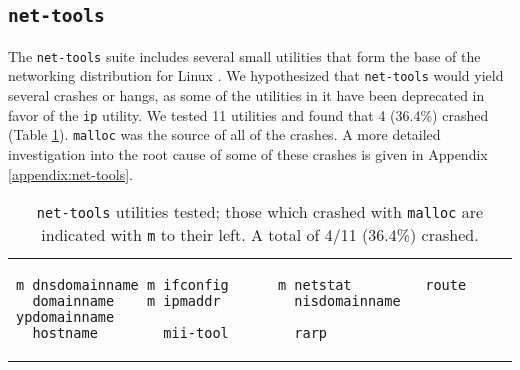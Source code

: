 \subsection{\texttt{net-tools}}
The \texttt{net-tools} suite includes several small utilities that form the base of the networking distribution for Linux \cite{nettools}. We hypothesized that \texttt{net-tools} would yield several crashes or hangs, as some of the utilities in it have been deprecated in favor of the \texttt{ip} utility. We tested 11 utilities and found that 4 (36.4\%) crashed (Table \ref{lst:net-tools}). \texttt{malloc} was the source of all of the crashes. A more detailed investigation into the root cause of some of these crashes is given in Appendix \ref{appendix:net-tools}.

\begin{table}[h]
\begin{tabular}{l}
\begin{lstlisting}
m dnsdomainname m ifconfig      m netstat         route
  domainname    m ipmaddr         nisdomainname   ypdomainname
  hostname        mii-tool        rarp
\end{lstlisting}
\end{tabular}
\caption{\texttt{net-tools} utilities tested; those which crashed with \texttt{malloc} are indicated with \texttt{m} to their left. A total of 4/11 (36.4\%) crashed.}
\label{lst:net-tools}
\end{table}